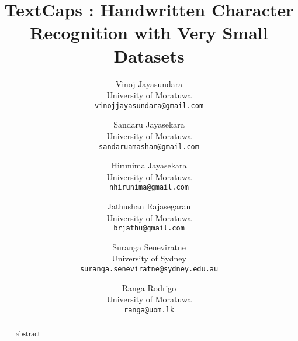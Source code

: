 \documentclass[10pt,twocolumn,letterpaper]{article}
\begin{document}
\title{TextCaps : Handwritten Character Recognition with Very Small Datasets}

\author{Vinoj Jayasundara \\
University of Moratuwa\\
{\tt\small vinojjayasundara@gmail.com}
\and
Sandaru Jayasekara \\
University of Moratuwa\\
{\tt\small sandaruamashan@gmail.com}
\and
Hirunima Jayasekara \\
University of Moratuwa\\
{\tt\small nhirunima@gmail.com}
\and
Jathushan Rajasegaran \\
University of Moratuwa\\
{\tt\small brjathu@gmail.com}
\and
Suranga Seneviratne \\
University of Sydney\\
{\tt\small suranga.seneviratne@sydney.edu.au}
\and
Ranga Rodrigo \\
University of Moratuwa\\
{\tt\small ranga@uom.lk}
}

\maketitle
\ifwacvfinal\thispagestyle{empty}\fi

\begin{abstract}
{abstract}
\end{abstract}
\end{document}
